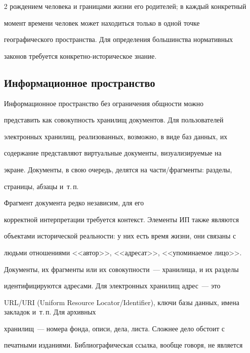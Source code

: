\begin{multicols}{2}
рождением человека и границами жизни его родителей; в каждый конкретный 


момент времени человек может находиться только в одной точке 


географического пространства. Для определения большинства нормативных 


законов требуется конкретно-историческое знание.





\subsection{Информационное пространство}


  


  Информационное пространство без ограничения общности можно 


представить как совокупность хранилищ документов. Для пользователей 


электронных хранилищ, реализованных, возможно, в виде баз данных, их 


содержание пред\-став\-ля\-ют виртуальные документы, визуализируемые на 


экране. Документы, в свою очередь, делятся на час\-ти/фрагменты: разделы, 


страницы, абзацы и~т.\,п.\linebreak


 Фрагмент документа редко независим, для его\linebreak 


корректной интерпретации требуется контекст. Элементы ИП также являются 


объектами исторической реальности: у них есть время жизни, они связаны с 


людьми отношениями <<автор>>, <<адресат>>, <<упоминаемое лицо>>.


  


  Документы, их фрагменты или их совокупности~--- хранилища, и их разделы 


идентифицируются адресами. Для электронных хранилищ адрес~--- это 


URL/URI (Uniform Resource Locator/Identifier), ключи базы данных, имена закладок и~т.\,п. Для архивных 


хранилищ~--- номера фонда, описи, дела, листа. Сложнее дело обстоит с 


печатными изданиями. Библиографическая ссылка, вообще говоря, не является 



\end{multicols}
